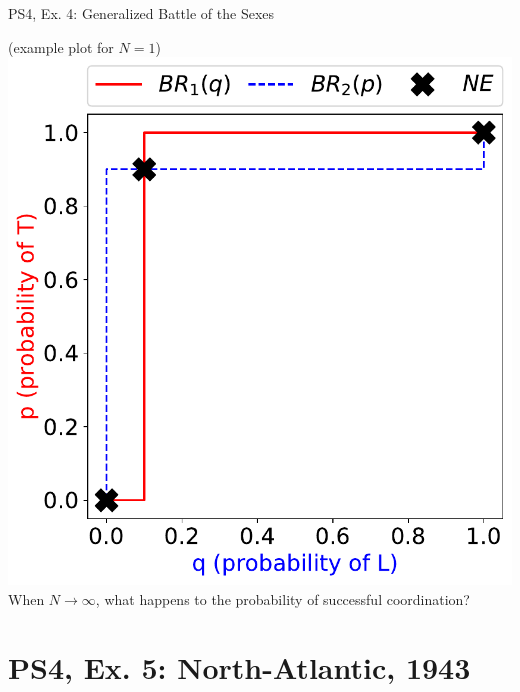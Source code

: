\begin{frame}{PS4, Ex. 4: Generalized Battle of the Sexes}
\begin{multicols}{2}
    (example plot for $N=1$)
    \includegraphics[width=\columnwidth]{figures/4b}
    \vspace{-0pt}
    When $N\rightarrow\infty$, what happens to the probability of successful coordination?
  \vfill\null
  \end{multicols}
\end{frame}


\section{PS4, Ex. 5: North-Atlantic, 1943}

